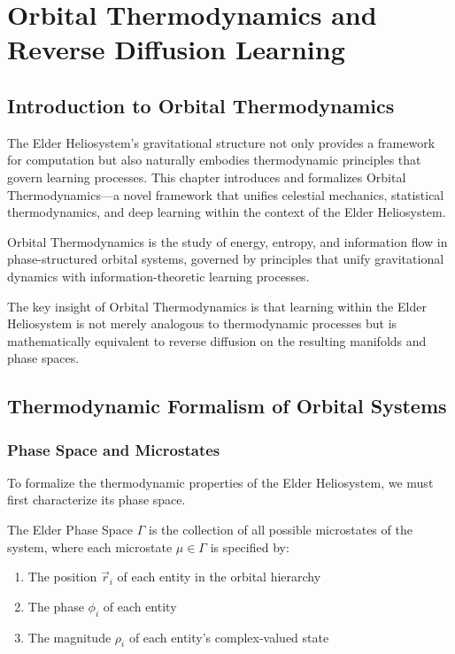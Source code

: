 \chapter{Orbital Thermodynamics and Reverse Diffusion Learning}

\section{Introduction to Orbital Thermodynamics}

The Elder Heliosystem's gravitational structure not only provides a framework for computation but also naturally embodies thermodynamic principles that govern learning processes. This chapter introduces and formalizes Orbital Thermodynamics—a novel framework that unifies celestial mechanics, statistical thermodynamics, and deep learning within the context of the Elder Heliosystem.

\begin{definition}
Orbital Thermodynamics is the study of energy, entropy, and information flow in phase-structured orbital systems, governed by principles that unify gravitational dynamics with information-theoretic learning processes.
\end{definition}

The key insight of Orbital Thermodynamics is that learning within the Elder Heliosystem is not merely analogous to thermodynamic processes but is mathematically equivalent to reverse diffusion on the resulting manifolds and phase spaces.

\section{Thermodynamic Formalism of Orbital Systems}

\subsection{Phase Space and Microstates}

To formalize the thermodynamic properties of the Elder Heliosystem, we must first characterize its phase space.

\begin{definition}
The Elder Phase Space $\Gamma$ is the collection of all possible microstates of the system, where each microstate $\mu \in \Gamma$ is specified by:
\begin{enumerate}
    \item The position $\vec{r}_i$ of each entity in the orbital hierarchy
    \item The phase $\phi_i$ of each entity
    \item The magnitude $\rho_i$ of each entity's complex-valued state
\end{enumerate}
\end{definition}

